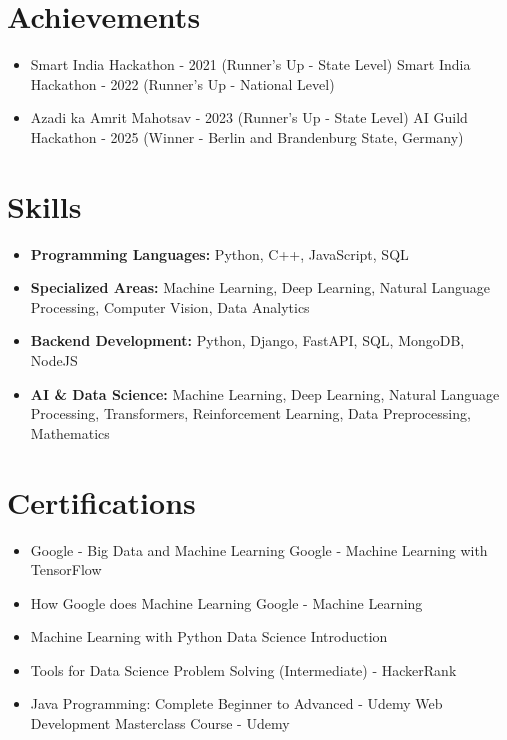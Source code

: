 \documentclass[a4paper,10pt]{article}
\begin{document}
\section*{Achievements}
\begin{itemize}
\item Smart India Hackathon - 2021 (Runner's Up - State Level) \hfill Smart India Hackathon - 2022 (Runner's Up - National Level)
\item Azadi ka Amrit Mahotsav - 2023 (Runner's Up - State Level) \hfill AI Guild Hackathon - 2025 (Winner - Berlin and Brandenburg State, Germany)
\end{itemize}

\section*{Skills}
\begin{itemize}
  \item \textbf{Programming Languages:} Python, C++, JavaScript, SQL
  \item \textbf{Specialized Areas:} Machine Learning, Deep Learning, Natural Language Processing, Computer Vision, Data Analytics
  \item \textbf{Backend Development:} Python, Django, FastAPI, SQL, MongoDB, NodeJS
  \item \textbf{AI \& Data Science:} Machine Learning, Deep Learning, Natural Language Processing, Transformers, Reinforcement Learning, Data Preprocessing, Mathematics
\end{itemize}

\section*{Certifications}
\begin{itemize}
\item Google - Big Data and Machine Learning \hfill Google - Machine Learning with TensorFlow
\item How Google does Machine Learning \hfill Google - Machine Learning
\item Machine Learning with Python \hfill Data Science Introduction
\item Tools for Data Science \hfill Problem Solving (Intermediate) - HackerRank
\item Java Programming: Complete Beginner to Advanced - Udemy \hfill Web Development Masterclass Course - Udemy
\end{itemize}
\end{document}
